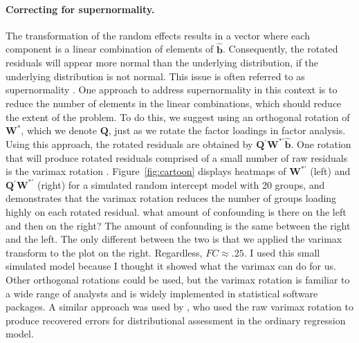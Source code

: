 \documentclass[12pt]{article} %
\newcommand{\hh}[1]{{\color{orange} #1}}
\newcommand{\al}[1]{{\color{red} #1}}
\newcommand{\trans}{\ensuremath{^\prime}}
\begin{document}
\paragraph{Correcting for supernormality.}
The transformation of the random effects results in a vector where each component is a linear combination of elements of $\widehat{\bm{b}}$. Consequently, the rotated residuals will appear more normal than the underlying distribution, if the underlying distribution is not normal. This issue is often referred to as supernormality \citep{Atkinson:1985}. One approach to address supernormality in this context is to reduce the number of elements in the linear combinations, which should reduce the extent of the problem. To do this, we suggest using an orthogonal rotation of $\bm{W}^*$, which we denote $\bm{Q}$, just as we rotate the factor loadings in factor analysis. Using this approach, the rotated residuals are obtained by $\bm{Q}\trans \bm{W}^{*\prime} \widehat{\bm{b}}$. One rotation that will produce rotated residuals comprised of a small number of raw residuals is the varimax rotation \citep{Johnson:2007}. Figure~\ref{fig:cartoon} displays heatmaps of $\bm{W}^{*\prime}$ (left) and $\bm{Q}\trans\bm{W}^{*\prime}$ (right) for a simulated random intercept model with 20 groups, and demonstrates that the varimax rotation reduces the number of groups loading highly on each rotated residual. \hh{what amount of confounding is there on the left and then on the right?} \al{The amount of confounding is the same between the right and the left. The only different between the two is that we applied the varimax transform to the plot on the right. Regardless, $FC \approx .25$. I used this small simulated model because I thought it showed what the varimax can do for us.} Other orthogonal rotations could be used, but the varimax rotation is familiar to a wide range of analysts and is widely implemented in statistical software packages. A similar approach was used by \cite{Jensen:1999iu}, who used the raw varimax rotation to produce recovered errors for distributional assessment in the ordinary regression model.
\end{document}
